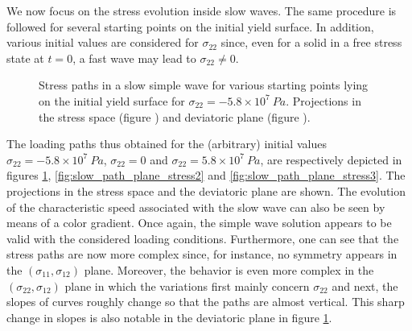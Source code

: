 We now focus on the stress evolution inside slow waves.
The same procedure is followed for several starting points on the initial yield surface.
In addition, various initial values are considered for $\sigma_{22}$ since, even for a solid in a free stress state at $t=0$, a fast wave may lead to $\sigma_{22}\neq 0$.
\begin{figure}[h!]
  \centering
  \caption{Stress paths in a slow simple wave for various starting points lying on the initial yield surface for $\sigma_{22}=-5.8\times 10^7 \: Pa$. Projections in the stress space (figure )  and deviatoric plane (figure ).}
  \label{fig:slow_path_plane_stress1}
\end{figure}
The loading paths thus obtained for the (arbitrary) initial values $\sigma_{22}=-5.8\times 10^7 \: Pa$, $\sigma_{22}=0$ and $\sigma_{22}=5.8\times 10^7 \: Pa$, are respectively depicted in figures \ref{fig:slow_path_plane_stress1}, \ref{fig:slow_path_plane_stress2} and \ref{fig:slow_path_plane_stress3}.
The projections in the stress space and the deviatoric plane are shown.
The evolution of the characteristic speed associated with the slow wave can also be seen by means of a color gradient.
Once again, the simple wave solution appears to be valid with the considered loading conditions.
Furthermore, one can see that the stress paths are now more complex since, for instance, no symmetry appears in the $(\sigma_{11},\sigma_{12})$ plane.
Moreover, the behavior is even more complex in the $(\sigma_{22},\sigma_{12})$ plane in which the variations first mainly concern $\sigma_{22}$ and next, the slopes of curves roughly change so that the paths are almost vertical.
This sharp change in slopes is also notable in the deviatoric plane in figure \ref{fig:slow_path_plane_stress1}.

